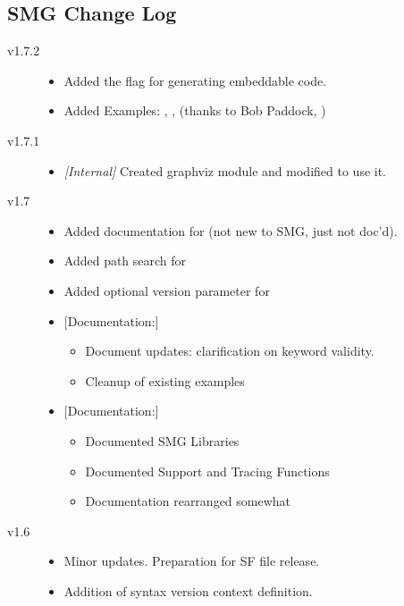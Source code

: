 \subsection{SMG Change Log}

\begin{description}

\item[v1.7.2]
  \begin{itemize}
    \item Added the  flag for generating embeddable code.
    \item Added Examples: , ,
       (thanks to Bob Paddock,
      )
  \end{itemize}
\item[v1.7.1]
  \begin{itemize}
  \item {\it [Internal]} Created graphviz module and modified
     to use it.
  \end{itemize}
\item[v1.7]
  \begin{itemize}
    \item Added documentation for \SMELSE (not new to SMG, just not doc'd).
    \item Added path search for \SMINCL
    \item Added optional version parameter for \SMINCL
    \item $[$Documentation:$]$
      \begin{itemize}
      \item Document updates: clarification on  keyword validity.
      \item Cleanup of existing examples
      \end{itemize}
    \item $[$Documentation:$]$
      \begin{itemize}
      \item Documented SMG Libraries
      \item Documented Support and Tracing Functions
      \item Documentation rearranged somewhat
      \end{itemize}
  \end{itemize}

\item[v1.6]
  \begin{itemize}
  \item Minor updates.  Preparation for SF file release.
  \item Addition of  syntax version context definition.
  \end{itemize}
  

\end{description}
